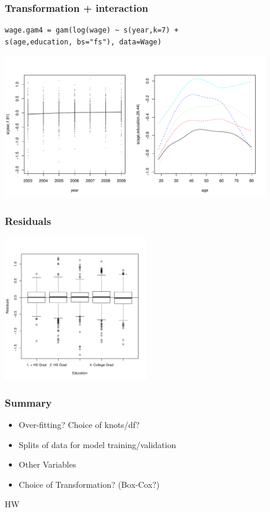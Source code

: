 \documentclass[]{beamer}
\begin{document}
\begin{frame}[fragile] \frametitle{Transformation + interaction}
\begin{verbatim}
wage.gam4 = gam(log(wage) ~ s(year,k=7) + 
s(age,education, bs="fs"), data=Wage)
\end{verbatim}
\centerline{\includegraphics[height=2.5in]{wage-int}}
\end{frame}

\begin{frame} \frametitle{Residuals}
  \centerline{\includegraphics[height=2.5in]{resid-wage4}}
\end{frame}

\begin{frame}\frametitle{Summary}
  \begin{itemize}
  \item Over-fitting?   Choice of knots/df?
  \item Splits of data for model training/validation
  \item Other Variables
  \item Choice of Transformation?   (Box-Cox?)
  \end{itemize}

HW
\end{frame}
\end{document}
